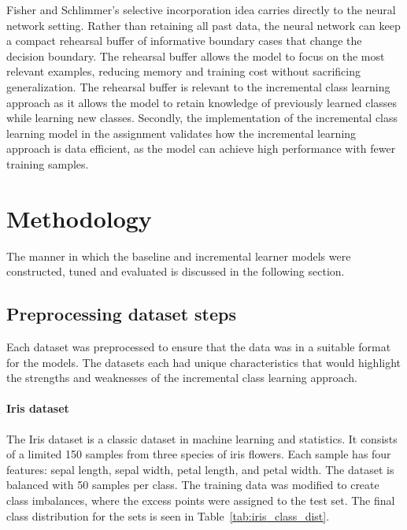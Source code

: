 \documentclass[conference]{IEEEtran}
\begin{document}
Fisher and Schlimmer's selective incorporation idea carries directly to the neural network setting. Rather than 
retaining all past data, the neural network can keep a compact rehearsal buffer of informative boundary cases that change the decision boundary. The rehearsal buffer allows the model to focus on the most relevant examples, reducing memory and training cost without sacrificing generalization. 
The rehearsal buffer is relevant to the incremental class learning approach as it allows the model to retain knowledge of previously learned classes while learning new classes. 
Secondly, the implementation of the incremental class learning model in the assignment validates how the incremental learning 
approach is data efficient, as the model can achieve high performance with fewer training samples.

\section{Methodology}
The manner in which the baseline and incremental learner models were constructed, tuned and evaluated is discussed in the following section. 

\subsection{Preprocessing dataset steps}
Each dataset was preprocessed to ensure that the data was in a suitable format for the models. The datasets each had unique characteristics 
that would highlight the strengths and weaknesses of the incremental class learning approach. 
\paragraph{Iris dataset}
The Iris dataset \cite{fisher1936iris} is a classic dataset in machine learning and statistics. It consists of a limited 150 samples from 
three species of iris flowers. Each sample has four features: sepal length, sepal width, petal length, and petal width. The dataset is balanced with 50 samples per class. 
 The training data was modified to create class imbalances, where the excess points were assigned to the test set. The final class 
distribution for the sets is seen in Table~\ref{tab:iris_class_dist}.
\begin{table}[H]
  \centering
  \caption{Class distribution of the modified Iris dataset}
  \label{tab:iris_class_dist}
\end{table}
\end{document}
